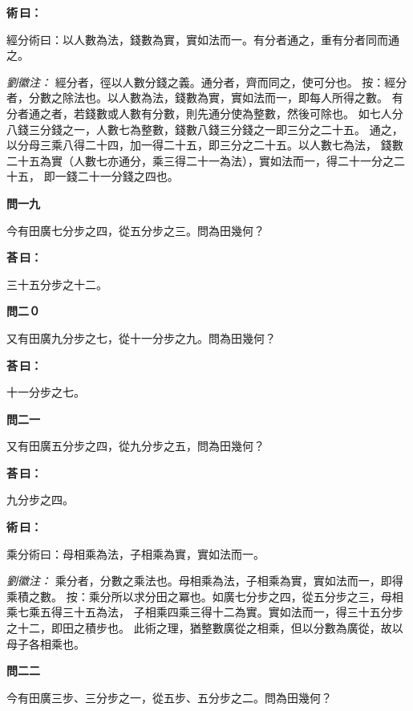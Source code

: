 \documentclass[11pt,a4paper]{article}
\newenvironment{problem}[1][]{%
  \par\vspace{0.6em}\noindent\textcolor{problemcolor}{\textbf{問\ignorespaces#1\unskip}\hspace{0.5em}}%
  \ignorespaces
}{\par\vspace{0.4em}}
\newenvironment{answer}{%
  \par\noindent\textcolor{answercolor}{\textbf{荅\,曰：}}%
  \ignorespaces
}{\par\vspace{0.3em}}
\newenvironment{method}{%
  \par\noindent\textcolor{methodcolor}{\textbf{術\,曰：}}%
  \ignorespaces
}{\par\vspace{0.4em}}
\newenvironment{liuhuicomm}{%
  \par\vspace{0.3em}\noindent\textcolor{commentarycolor}{\small\textit{劉徽注：}}}%
  {\par\vspace{0.5em}}
\begin{document}
\begin{method}
經分術曰：以人數為法，錢數為實，實如法而一。有分者通之，重有分者同而通之。
\end{method}

\begin{liuhuicomm}
經分者，徑以人數分錢之義。通分者，齊而同之，使可分也。
按：經分者，分數之除法也。以人數為法，錢數為實，實如法而一，即每人所得之數。
有分者通之者，若錢數或人數有分數，則先通分使為整數，然後可除也。
如七人分八錢三分錢之一，人數七為整數，錢數八錢三分錢之一即三分之二十五。
通之，以分母三乘八得二十四，加一得二十五，即三分之二十五。以人數七為法，
錢數二十五為實（人數七亦通分，乘三得二十一為法），實如法而一，得二十一分之二十五，
即一錢二十一分錢之四也。
\end{liuhuicomm}

\begin{problem}[一九]
今有田廣七分步之四，從五分步之三。問為田幾何？
\end{problem}

\begin{answer}
三十五分步之十二。
\end{answer}

\begin{problem}[二０]
又有田廣九分步之七，從十一分步之九。問為田幾何？
\end{problem}

\begin{answer}
十一分步之七。
\end{answer}

\begin{problem}[二一]
又有田廣五分步之四，從九分步之五，問為田幾何？
\end{problem}

\begin{answer}
九分步之四。
\end{answer}

\begin{method}
乘分術曰：母相乘為法，子相乘為實，實如法而一。
\end{method}

\begin{liuhuicomm}
乘分者，分數之乘法也。母相乘為法，子相乘為實，實如法而一，即得乘積之數。
按：乘分所以求分田之冪也。如廣七分步之四，從五分步之三，母相乘七乘五得三十五為法，
子相乘四乘三得十二為實。實如法而一，得三十五分步之十二，即田之積步也。
此術之理，猶整數廣從之相乘，但以分數為廣從，故以母子各相乘也。
\end{liuhuicomm}

\begin{problem}[二二]
今有田廣三步、三分步之一，從五步、五分步之二。問為田幾何？
\end{problem}
\end{document}
